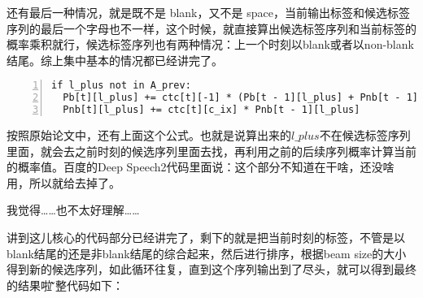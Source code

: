 还有最后一种情况，就是既不是 blank，又不是 space，当前输出标签和候选标签序列的最后一个字母也不一样，这个时候，就直接算出候选标签序列和当前标签的概率乘积就行，候选标签序列也有两种情况：上一个时刻以blank或者以non-blank结尾。综上集中基本的情况都已经讲完了。

\begin{lstlisting}[language = shell, numbers=left, 
         numberstyle=\tiny,keywordstyle=\color{blue!70},
         commentstyle=\color{red!50!green!50!blue!50},frame=shadowbox,
         rulesepcolor=\color{red!20!green!20!blue!20},basicstyle=\ttfamily]
if l_plus not in A_prev:
  Pb[t][l_plus] += ctc[t][-1] * (Pb[t - 1][l_plus] + Pnb[t - 1][l_plus])
  Pnb[t][l_plus] += ctc[t][c_ix] * Pnb[t - 1][l_plus]
\end{lstlisting}

按照原始论文中，还有上面这个公式。也就是说算出来的$l\_plus$不在候选标签序列里面，就会去之前时刻的候选序列里面去找，再利用之前的后续序列概率计算当前的概率值。百度的Deep Speech2代码里面说：这个部分不知道在干啥，还没啥用，所以就给去掉了。

我觉得……也不太好理解……

讲到这儿核心的代码部分已经讲完了，剩下的就是把当前时刻的标签，不管是以blank结尾的还是非blank结尾的综合起来，然后进行排序，根据beam size的大小得到新的候选序列，如此循环往复，直到这个序列输出到了尽头，就可以得到最终的结果啦\~\~\~

完整代码如下：

